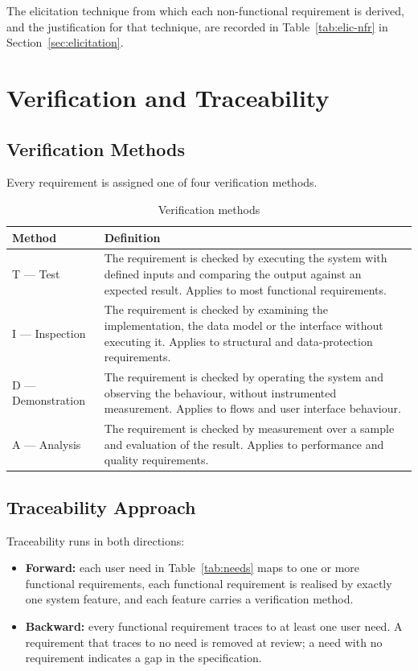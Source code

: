 \documentclass[11pt,a4paper]{report}
\begin{document}
\noindent The elicitation technique from which each non-functional requirement is derived, and
the justification for that technique, are recorded in Table~\ref{tab:elic-nfr} in
Section~\ref{sec:elicitation}.

\chapter{Verification and Traceability}
\label{ch:verification}
\label{sec:traceability}

\section{Verification Methods}
Every requirement is assigned one of four verification methods.

\begin{table}[htbp]
\centering\small
\caption{Verification methods}\label{tab:methods}
\begin{tabularx}{\textwidth}{@{}lX@{}}
\toprule
\textbf{Method} & \textbf{Definition} \\ \midrule
T --- Test & The requirement is checked by executing the system with defined inputs and comparing the output against an expected result. Applies to most functional requirements. \\
I --- Inspection & The requirement is checked by examining the implementation, the data model or the interface without executing it. Applies to structural and data-protection requirements. \\
D --- Demonstration & The requirement is checked by operating the system and observing the behaviour, without instrumented measurement. Applies to flows and user interface behaviour. \\
A --- Analysis & The requirement is checked by measurement over a sample and evaluation of the result. Applies to performance and quality requirements. \\
\bottomrule
\end{tabularx}
\end{table}

\section{Traceability Approach}
Traceability runs in both directions:
\begin{itemize}
  \item \textbf{Forward:} each user need in Table~\ref{tab:needs} maps to one or more
        functional requirements, each functional requirement is realised by exactly one system
        feature, and each feature carries a verification method.
  \item \textbf{Backward:} every functional requirement traces to at least one user need. A
        requirement that traces to no need is removed at review; a need with no requirement
        indicates a gap in the specification.
\end{itemize}
\end{document}
